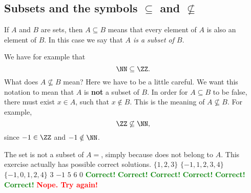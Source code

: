 \documentclass{article}
\newcommand{\red}[1]{\textcolor{red}{\textbf{#1}}}
\newcommand{\green}[1]{\textcolor{green}{\textbf{#1}}}
\begin{document}






\subsection{Subsets and the symbols $\subseteq$ and $\not\subseteq$}

If $A$ and $B$ are sets, then $A\subseteq B$ means that
every element of $A$ is also an element of $B$. In this case we say
that \emph{$A$ is a subset of $B$}.

We have
for example that 
$$
\NN \subseteq \ZZ.
$$
What does $A\not\subseteq B$ mean? Here we have to be a little
careful. We want this notation to mean that $A$ is \textbf{not} a
subset of $B$. In order for $A\subseteq B$ to be
false, there must exist $x\in A$, such that $x\notin B$. This
is the meaning of $A\not\subseteq B$. For example, 
$$
\ZZ\not\subseteq \NN,
$$
since $-1\in \ZZ$ and $-1\notin \NN$.

\begin{quizexercise}[showhide]
\begin{paraquiz}
  \question
  The set \box is not a subset of $A=$\box, simply because \box does not belong to $A$.
  This exercise actually has \box possible correct solutions.
  \answer
  $\{1, 2, 3\}$
  \answer
  $\{-1, 1, 2, 3, 4\}$
  \answer
  $\{-1, 0, 1, 2, 4\}$
  \answer
  $3$
  \answer
  $-1$
  \answer
  $5$
  \answer
  $6$
  \answer
  $0$
  \green{Correct!}
  \green{Correct!}
  \green{Correct!}
  \green{Correct!}
  \green{Correct!}
  \green{Correct!}
  \red{Nope. Try again!}
\end{paraquiz}
\end{quizexercise}
\end{document}
